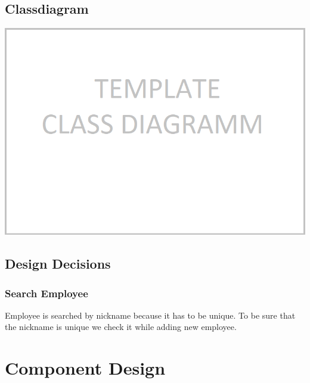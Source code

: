 \subsection{Classdiagram}
\includegraphics[scale=0.65]{ClassDiagram}

\subsection{Design Decisions}
\subsubsection{}
\subsubsection{}
\subsubsection{Search Employee}
Employee is searched by nickname because it has to be unique. To be sure that the nickname is unique we check it while adding new employee.

\section{Component Design}
